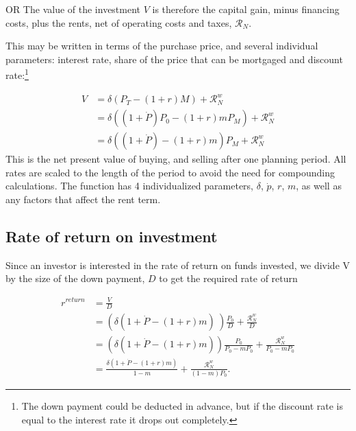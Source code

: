 OR The value of the investment $V$ is therefore the capital gain, minus financing costs, plus the rents, net of operating costs and taxes, $\mathcal{R}_N$.
 
 This may be written in terms of the purchase price, and several individual parameters: interest  rate, share of the price that can be mortgaged and  discount rate:\footnote{The down payment could be deducted in advance, but if the discount rate is equal to the interest rate it drops out completely.}
 
\begin{align}
V &= \delta \left(P_T - (1+r)M\right) +   \mathcal{R}^w_N   \\
&= \delta \left((1+\dot P) P_0 - (1+r)mP_M\right)  +      \mathcal{R}^w_N \\
  &= \delta \left((1+\dot P)    - (1+r)m    \right) P_M + \mathcal{R}^w_N 
\end{align}
This is the net present value of buying, and selling after one planning period. All rates are scaled to the length of the period to avoid the need for compounding calculations. The function has 4 individualized  parameters, $\delta$, $\dot p$, $r$, $m$, as well as any factors that affect the rent term.


\subsection{Rate of return on investment}
Since an investor is interested in the rate of return on funds invested, we divide V by the size of the down payment, $D$ to get the required rate of return  

\begin{align}
r^{return} 
  &= \frac{V}{D}  \nonumber \\
  &= \left(\delta \left(1+\dot P - (1+r)m\right) \ \right) \frac{P_0}{D}  + \frac{\mathcal{R}^w_N }{D}      \nonumber \\
  &= \left(\delta \left(1+\dot P - (1+r)m\right)  \right) \frac{P_0}{P_0-mP_0} +  \frac{\mathcal{R}^w_N }{P_0-mP_0}  \\ 
  &= \frac{\delta \left(1+\dot P - (1+r)m\right) }{1-m} +\frac{\mathcal{R}^w_N }{(1-m)P_0}.
\label{eqn-property-investment-return1}
\end{align}


